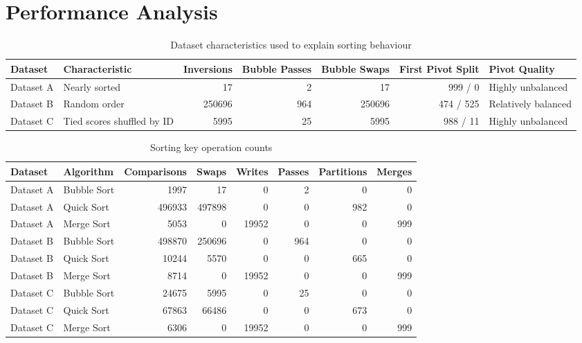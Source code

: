 \documentclass[12pt,a4paper,twocolumn,openany]{report}
\begin{document}
\section{Performance Analysis}

\begin{table}[t]
\centering
\caption{Dataset characteristics used to explain sorting behaviour}
\label{tab:dataset-characteristics}
\scriptsize
\begin{tabular}{llrrrrl}
\toprule
Dataset & Characteristic & Inversions & Bubble Passes & Bubble Swaps & First Pivot Split & Pivot Quality \\
\midrule
Dataset A & Nearly sorted & 17 & 2 & 17 & 999 / 0 & Highly unbalanced \\
Dataset B & Random order & 250696 & 964 & 250696 & 474 / 525 & Relatively balanced \\
Dataset C & Tied scores shuffled by ID & 5995 & 25 & 5995 & 988 / 11 & Highly unbalanced \\
\bottomrule
\end{tabular}
\end{table}

\begin{table}[t]
\centering
\caption{Sorting key operation counts}
\label{tab:sorting-operation-counts}
\scriptsize
\setlength{\tabcolsep}{3pt}
\begin{tabular}{llrrrrrr}
\toprule
Dataset & Algorithm & Comparisons & Swaps & Writes & Passes & Partitions & Merges \\
\midrule
Dataset A & Bubble Sort & 1997 & 17 & 0 & 2 & 0 & 0 \\
Dataset A & Quick Sort & 496933 & 497898 & 0 & 0 & 982 & 0 \\
Dataset A & Merge Sort & 5053 & 0 & 19952 & 0 & 0 & 999 \\
Dataset B & Bubble Sort & 498870 & 250696 & 0 & 964 & 0 & 0 \\
Dataset B & Quick Sort & 10244 & 5570 & 0 & 0 & 665 & 0 \\
Dataset B & Merge Sort & 8714 & 0 & 19952 & 0 & 0 & 999 \\
Dataset C & Bubble Sort & 24675 & 5995 & 0 & 25 & 0 & 0 \\
Dataset C & Quick Sort & 67863 & 66486 & 0 & 0 & 673 & 0 \\
Dataset C & Merge Sort & 6306 & 0 & 19952 & 0 & 0 & 999 \\
\bottomrule
\end{tabular}
\end{table}
\end{document}
